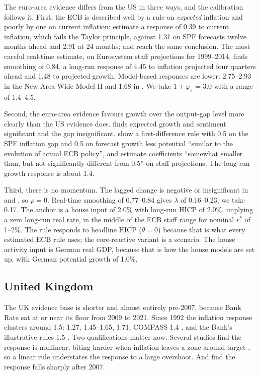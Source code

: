 \documentclass[11pt,a4paper]{article}
\begin{document}
The euro-area evidence differs from the US in three ways, and the calibration follows it. First, the ECB is described well by a rule on \emph{expected} inflation and poorly by one on current inflation: \textcite{gerdesmeier2004} estimate a response of 0.39 to current inflation, which fails the Taylor principle, against 1.31 on SPF forecasts twelve months ahead and 2.91 at 24 months; \textcite{sauersturm2007} and \textcite{gorter2008} reach the same conclusion. The most careful real-time estimate, \textcite{paloviita2021} on Eurosystem staff projections for 1999--2014, finds smoothing of 0.84, a long-run response of 4.45 to inflation projected four quarters ahead and 1.48 to projected growth. Model-based responses are lower: 2.75--2.93 in the New Area-Wide Model II \parencite{coenen2018,darracq2026} and 1.68 in \textcite{smetswouters2003}. We take $1+\varphi_\pi=3.0$ with a range of 1.4--4.5.

Second, the euro-area evidence favours growth over the output-gap level more clearly than the US evidence does. \textcite{gerlach2007} finds expected growth and sentiment significant and the gap insignificant. \textcite{orphanideswieland2013} show a first-difference rule with 0.5 on the SPF inflation gap and 0.5 on forecast growth less potential ``similar to the evolution of actual ECB policy'', and \textcite{hartmannsmets2018} estimate coefficients ``somewhat smaller than, but not significantly different from 0.5'' on staff projections. The long-run growth response is about 1.4.

Third, there is no momentum. The lagged change is negative or insignificant in \textcite{gerlachlewis2014} and \textcite{gerlach2007}, so $\rho=0$. Real-time smoothing of 0.77--0.84 gives $\lambda$ of 0.16--0.23; we take 0.17. The anchor is a house input of 2.0\% with long-run HICP of 2.0\%, implying a zero long-run real rate, in the middle of the ECB staff range for nominal $r^*$ of 1\textonequarter--2\textonequarter\%. The rule responds to headline HICP ($\theta=0$) because that is what every estimated ECB rule uses; the core-reactive variant is a scenario. The house activity input is German real GDP, because that is how the house models are set up, with German potential growth of 1.0\%.

\subsection{United Kingdom}

The UK evidence base is shorter and almost entirely pre-2007, because Bank Rate sat at or near its floor from 2009 to 2021. Since 1992 the inflation response clusters around 1.5: \textcite{nelson2000} 1.27, \textcite{martinmilas2004} 1.45--1.65, \textcite{boinetmartin2008} 1.71, COMPASS 1.4 \parencite{burgess2013}, and the Bank's illustrative rules 1.5 \parencite{boe2025mpr}. Two qualifications matter now. Several studies find the response is nonlinear, biting harder when inflation leaves a zone around target \parencite{martinmilas2004,tayloredavradakis2006}, so a linear rule understates the response to a large overshoot. And \textcite{martinmilas2013} find the response falls sharply after 2007.
\end{document}
